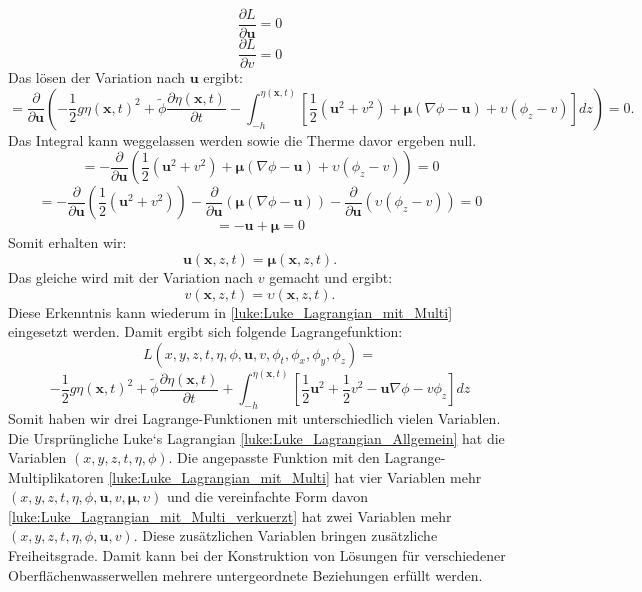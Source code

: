\[
\frac{\partial L}{\partial \bm{u}} = 0
\]
\[
\frac{\partial L}{\partial v} = 0	
\]
Das lösen der Variation nach $\bm{u}$ ergibt:
\[
 = \frac{\partial \mathscr{}}{\partial \bm{u}}\left( -\frac{1}{2} g \eta(\bm{x},t)^2 + \widetilde{\phi} \frac{\partial\eta(\bm{x},t)}{\partial t} - \int_{-h}^{\eta(\bm{x},t)} \left[ \frac{1}{2} (\bm{u}^2 + v^2) + \bm{\mu} (\nabla\phi - \bm{u}) + \upsilon \left(\phi_z - v\right) \right] dz\right)
 = 0.
\]
Das Integral kann weggelassen werden sowie die Therme davor ergeben null.
\[
= -\frac{\partial}{\partial \bm{u}} \left(\frac{1}{2} (\bm{u}^2 + v^2) + \bm{\mu} (\nabla\phi - \bm{u}) + \upsilon \left(\phi_z - v\right) \right) = 0
\]
\[
= -\frac{\partial}{\partial \bm{u}} \left( \frac{1}{2} (\bm{u}^2 + v^2) \right)  -\frac{\partial}{\partial \bm{u}} \left( \bm{\mu} (\nabla\phi - \bm{u}) \right)  -\frac{\partial}{\partial \bm{u}} \left( \upsilon \left(\phi_z - v\right) \right) = 0
\]
\[
=
-\bm{u}
+\bm{\mu}
= 0
\]
Somit erhalten wir:
\begin{equation}
	\bm{u}(\bm{x},z,t) = \bm{\mu}(\bm{x},z,t).
\end{equation}
Das gleiche wird mit der Variation nach $v$ gemacht und ergibt:
\begin{equation}
	v(\bm{x},z,t) = \upsilon(\bm{x},z,t).
\end{equation}
Diese Erkenntnis kann wiederum in \eqref{luke:Luke_Lagrangian_mit_Multi} eingesetzt werden.
Damit ergibt sich folgende Lagrangefunktion:
\[
L(x,y,z,t,\eta,\phi,\bm{u}, v,\phi_t,\phi_x, \phi_y, \phi_z)
=
\]
\begin{equation}
	-
	\frac{1}{2} g \eta(\bm{x},t)^2
	+
	\widetilde{\phi} \frac{\partial\eta(\bm{x},t)}{\partial t}
	+
	\int_{-h}^{\eta(\bm{x},t)} \left[ \frac{1}{2} \bm{u}^2 + \frac{1}{2} v^2 - \bm{u} \nabla \phi - v \phi_z \right] dz 
	\label{luke:Luke_Lagrangian_mit_Multi_verkuerzt}
\end{equation}
Somit haben wir drei Lagrange-Funktionen mit unterschiedlich vielen Variablen.
Die Ursprüngliche Luke`s Lagrangian \eqref{luke:Luke_Lagrangian_Allgemein} hat die Variablen $(x,y,z,t,\eta,\phi)$.
Die angepasste Funktion mit den Lagrange-Multiplikatoren \eqref{luke:Luke_Lagrangian_mit_Multi} hat vier Variablen mehr $(x,y,z,t,\eta,\phi,\bm{u},v,\bm{\mu},\upsilon)$ und die vereinfachte Form davon \eqref{luke:Luke_Lagrangian_mit_Multi_verkuerzt} hat zwei Variablen mehr $(x,y,z,t,\eta,\phi,\bm{u},v)$.
Diese zusätzlichen Variablen bringen zusätzliche Freiheitsgrade.
Damit kann bei der Konstruktion von Lösungen für verschiedener Oberflächenwasserwellen mehrere untergeordnete Beziehungen erfüllt werden.

